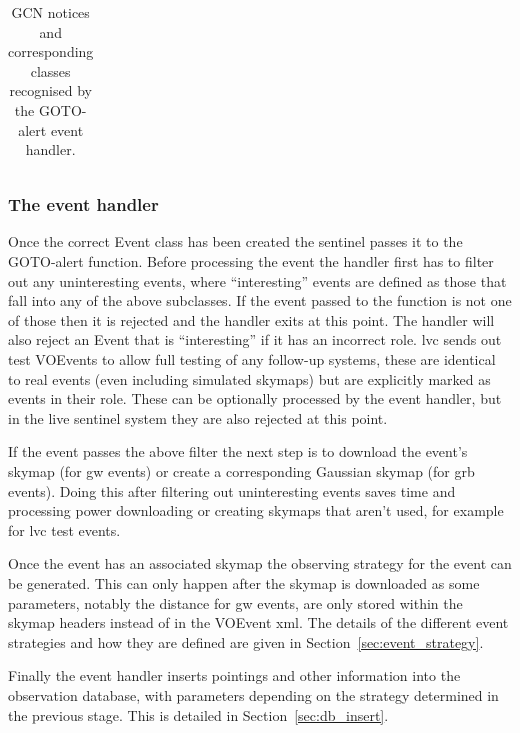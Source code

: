\begin{colsection}
\begin{colsection}
\begin{table}[t]
\begin{center}
\begin{tabular}{clll}
\end{tabular}
\end{center}
\caption[GCN notices recognised by the GOTO-alert event handler]{GCN notices and corresponding classes recognised by the GOTO-alert event handler.}
\label{tab:events}
\end{table}

\subsubsection{The event handler}

Once the correct Event class has been created the sentinel passes it to the GOTO-alert  function. Before processing the event the handler first has to filter out any uninteresting events, where ``interesting'' events are defined as those that fall into any of the above subclasses. If the event passed to the function is not one of those then it is rejected and the handler exits at this point. The handler will also reject an Event that is ``interesting'' if it has an incorrect role. \gls{lvc} sends out test VOEvents to allow full testing of any follow-up systems, these are identical to real events (even including simulated skymaps) but are explicitly marked as  events in their role. These can be optionally processed by the event handler, but in the live sentinel system they are also rejected at this point.

If the event passes the above filter the next step is to download the event's skymap (for \gls{gw} events) or create a corresponding Gaussian skymap (for \gls{grb} events). Doing this after filtering out uninteresting events saves time and processing power downloading or creating skymaps that aren't used, for example for \gls{lvc} test events.

Once the event has an associated skymap the observing strategy for the event can be generated. This can only happen after the skymap is downloaded as some parameters, notably the distance for \gls{gw} events, are only stored within the skymap headers instead of in the VOEvent \gls{xml}. The details of the different event strategies and how they are defined are given in Section~\ref{sec:event_strategy}.

Finally the event handler inserts pointings and other information into the observation database, with parameters depending on the strategy determined in the previous stage. This is detailed in Section~\ref{sec:db_insert}.


\end{colsection}
\end{colsection}
